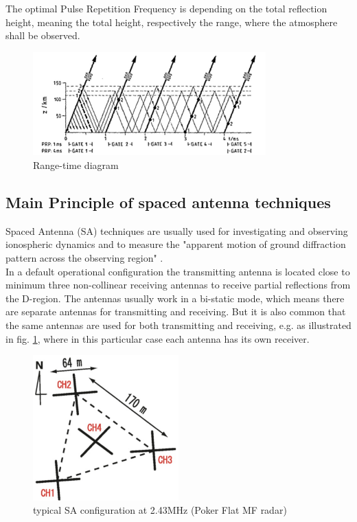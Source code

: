 The optimal Pulse Repetition Frequency is depending on the total reflection height, meaning the total height, respectively the range, where the atmosphere shall be observed.
\begin{figure}[h]
	\centering
	\includegraphics[width=0.8\textwidth]{images/maxPRF}	
	\caption{Range-time diagram \citep[c.f.][Fig. 5]{reid2015mf} }
\end{figure}


\subsection{Main Principle of spaced antenna techniques}
Spaced Antenna (SA) techniques are usually used for investigating and observing ionospheric dynamics and to measure the "apparent motion of ground diffraction pattern across the observing region" \citep{reid2015mf}.\\
In a default operational configuration the transmitting antenna is located close to minimum three non-collinear receiving antennas to receive partial reflections from the D-region. The antennas usually work in a bi-static mode, which means there are separate antennas for transmitting and receiving. But it is also common that the same antennas are used for both transmitting and receiving, e.g. as illustrated in fig. \ref{fig:SAconfing}, where in this particular case each antenna has its own receiver.

\begin{figure}
	\centering
	\includegraphics[width=0.5\textwidth]{images/SA_config}
	\caption{typical SA configuration at 2.43MHz (Poker Flat MF radar) \citep[c.f][Fig. 2]{reid2015mf} }
	\label{fig:SAconfing}
\end{figure}

